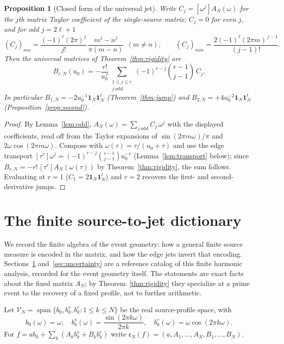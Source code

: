 \documentclass[11pt]{article}
\theoremstyle{plain}
\newtheorem{proposition}[theorem]{Proposition}
\theoremstyle{definition}
\theoremstyle{remark}
\newcommand{\one}{\mathbf 1}
\begin{document}
\begin{proposition}[Closed form of the universal jet]\label{prop:Bform}
Write $C_j=[\omega^j]A_N(\omega)$ for the $j$th matrix Taylor coefficient of the
single-source matrix; $C_j=0$ for even $j$, and for odd $j=2\ell+1$
\[
 (C_j)_{mn}=\frac{(-1)^\ell(2\pi)^j}{j!}\,\frac{m^j-n^j}{\pi(m-n)}\ \ (m\ne n),
 \qquad
 (C_j)_{mm}=\frac{2(-1)^\ell(2\pi m)^{\,j-1}}{(j-1)!}.
\]
Then the universal matrices of Theorem~\ref{thm:rigidity} are
\[
 B_{r,N}(u_0)=-\frac{r!}{u_0^{\,r}}
 \sum_{\substack{1\le j\le r\\ j\ \mathrm{odd}}}
 (-1)^{r-j}\binom{r-1}{j-1}\,C_j .
\]
In particular $B_{1,N}=-2u_0^{-1}\one_N\one_N^t$ (Theorem~\ref{thm:jump}) and
$B_{2,N}=+4u_0^{-2}\one_N\one_N^t$ (Proposition~\ref{prop:second}).
\end{proposition}

\begin{proof}
By Lemma~\ref{lem:odd}, $A_N(\omega)=\sum_{j\ \mathrm{odd}}C_j\,\omega^j$ with the
displayed coefficients, read off from the Taylor expansions of
$\sin(2\pi m\omega)/\pi$ and $2\omega\cos(2\pi m\omega)$. Compose with
$\omega(\tau)=\tau/(u_0+\tau)$ and use the edge transport
$[\tau^r]\omega^j=(-1)^{r-j}\binom{r-1}{j-1}u_0^{-r}$ (Lemma~\ref{lem:transport}
below); since $B_{r,N}=-r!\,[\tau^r]A_N(\omega(\tau))$ by
Theorem~\ref{thm:rigidity}, the sum follows. Evaluating at $r=1$ ($C_1=2\one_N\one_N^t$)
and $r=2$ recovers the first- and second-derivative jumps.
\end{proof}

\section{The finite source-to-jet dictionary}\label{sec:dictionary}

We record the finite algebra of the event geometry: how a general finite source
measure is encoded in the matrix, and how the edge jets invert that encoding.
Sections~\ref{sec:dictionary} and~\ref{sec:uncertainty} are a reference catalog
of this finite harmonic analysis, recorded for the event geometry itself.
The statements are exact facts about the fixed matrix $A_N$; by
Theorem~\ref{thm:rigidity} they specialize at a prime event to the recovery of a
fixed profile, not to further arithmetic.

Let $\mathcal V_N=\operatorname{span}\{b_0,b_k^s,b_k^c:1\le k\le N\}$ be the real
source-profile space, with
\[
 b_0(\omega)=\omega,\quad
 b_k^s(\omega)=\frac{\sin(2\pi k\omega)}{2\pi k},\quad
 b_k^c(\omega)=\omega\cos(2\pi k\omega).
\]
For $f=a b_0+\sum_k(A_kb_k^s+B_kb_k^c)$ write
$\mathfrak c_N(f)=(a,A_1,\dots,A_N,B_1,\dots,B_N)$.
\end{document}
